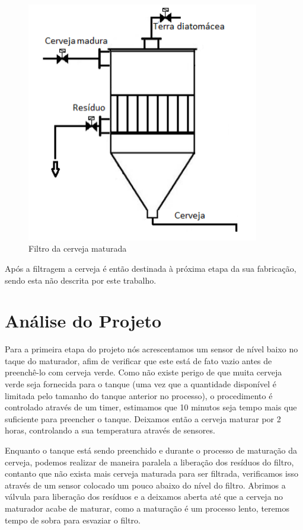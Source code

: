 \documentclass[12pt]{article}
\begin{document}
	\begin{figure}[H]
		\centering
		\includegraphics [width=4in]{filtro.png}
		\caption {Filtro da cerveja maturada}
		\label{fig:filtro}
	\end{figure}
	
	Após a filtragem a cerveja é então destinada à próxima etapa da sua fabricação, sendo esta não descrita por este trabalho.
	
	\section {Análise do Projeto}
	\label{sec:analise}
	Para a primeira etapa do projeto nós acrescentamos um sensor de nível baixo no taque do maturador, afim de verificar que este está de fato vazio antes de preenchê-lo com cerveja verde. Como não existe perigo de que muita cerveja verde seja fornecida para o tanque (uma vez que a quantidade disponível é limitada pelo tamanho do tanque anterior no processo), o procedimento é controlado através de um timer, estimamos que 10 minutos seja tempo mais que suficiente para preencher o tanque. Deixamos então a cerveja maturar por 2 horas, controlando a sua temperatura através de sensores.
	
	Enquanto o  tanque está sendo preenchido e durante o processo de maturação da cerveja, podemos realizar de maneira paralela a liberação dos resíduos do filtro, contanto que não exista mais cerveja maturada para ser filtrada, verificamos isso através de um sensor colocado um pouco abaixo do nível do filtro. Abrimos a válvula para liberação dos resíduos e a deixamos aberta até que a cerveja no maturador acabe de maturar, como a maturação é um processo lento, teremos tempo de sobra para esvaziar o filtro.
	
\end{document}
